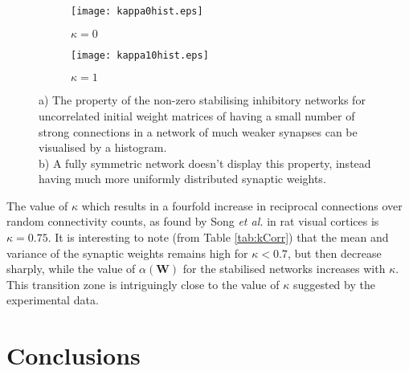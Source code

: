\documentclass[12pt, a4paper]{article}
\begin{document}
\begin{figure}[h]
    \begin{subfigure}{0.5\textwidth}
        \centering
        \texttt{[image: kappa0hist.eps]}
        \caption{$\kappa = 0$}
        \label{fig:k0hist}
    \end{subfigure}
    \begin{subfigure}{0.5\textwidth}
        \centering
        \texttt{[image: kappa10hist.eps]}
        \caption{$\kappa = 1$}
        \label{fig:k10hist}
    \end{subfigure}
    \caption{a) The property of the non-zero stabilising inhibitory networks for uncorrelated initial weight matrices of having a small number of strong connections in a network of much weaker synapses can be visualised by a histogram.  \\b) A fully symmetric network doesn't display this property, instead having much more uniformly distributed synaptic weights.}
    \label{fig:khist}
\end{figure}
\FloatBarrier    
    


The value of $\kappa$ which results in a fourfold increase in reciprocal connections over random connectivity counts, as found by Song \emph{et al.} in rat visual cortices is $\kappa = 0.75$. It is interesting to note (from Table \ref{tab:kCorr}) that the mean and variance of the synaptic weights remains high for $\kappa < 0.7$, but then decrease sharply, while the value of $\alpha(\mathbf{W})$ for the stabilised networks increases with $\kappa$.  This transition zone is intriguingly close to the value of $\kappa$ suggested by the experimental data. 




\pagebreak
\FloatBarrier
\section{Conclusions}
\end{document}
